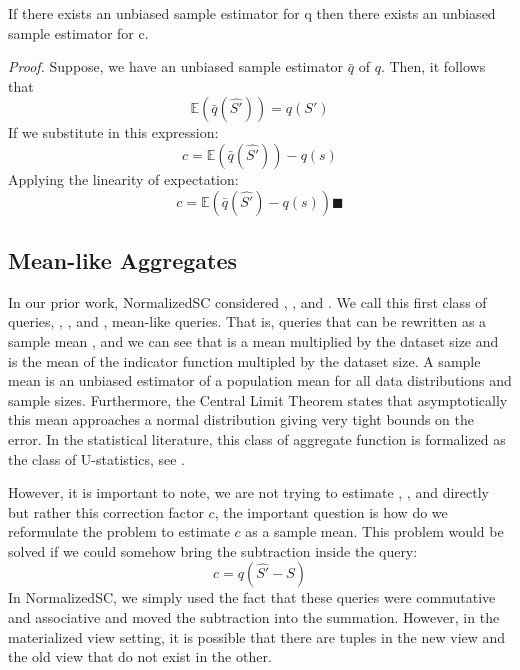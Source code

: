 \begin{lemma}
If there exists an unbiased sample estimator for q then there exists an unbiased sample estimator for c.
\end{lemma}

\emph{Proof.} Suppose, we have an unbiased sample estimator $\bar{q}$ of $q$. 
Then, it follows that \[\mathbb{E}(\bar{q}(\hat{S'})) = q(S')\]
If we substitute in this expression:
\[ c = \mathbb{E}(\bar{q}(\hat{S'})) -q(s) \] 
Applying the linearity of expectation:
\[ c = \mathbb{E}(\bar{q}(\hat{S'}) - q(s)) \blacksquare \]

\subsection{Mean-like Aggregates}

In our prior work, NormalizedSC considered \sumfunc, \countfunc, and \avgfunc.
We call this first class of queries,  \sumfunc, \countfunc, and \avgfunc, mean-like queries.
That is, queries that can be rewritten as a sample mean , and we can see that \sumfunc is a mean multiplied by the dataset size and \countfunc is the mean of the indicator function multipled by the dataset size.
A sample mean is an unbiased estimator of a population mean for all data distributions and sample sizes.
Furthermore, the Central Limit Theorem states that asymptotically this mean approaches a normal distribution giving very tight bounds on the error.
In the statistical literature, this class of aggregate function is formalized as the class of U-statistics, see \cite{hoeffding1948class}.

However, it is important to note, we are not trying to estimate \sumfunc, \countfunc, and \avgfunc directly but rather this correction factor $c$, the important question is how do we reformulate the problem to estimate $c$ as a sample mean.
This problem would be solved if we could somehow bring the subtraction inside the query:
\[ c = q(\hat{S'} - S)\] 
 In NormalizedSC, we simply used the fact that these queries were commutative and associative and moved the subtraction into the summation. 
However, in the materialized view setting, it is possible that there are tuples in the new view and the old view that do not exist in the other.

